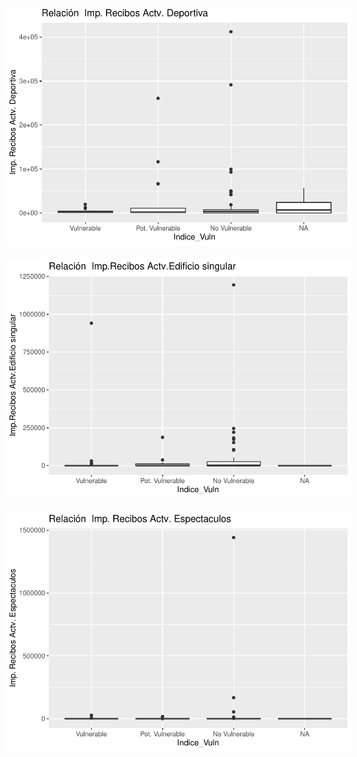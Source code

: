 \documentclass[notspecified,article,submit,moreauthors,pdftex]{Definitions/mdpi}
\begin{document}
\begin{center}\includegraphics{./figure/unnamed-chunk-23-23} \end{center}

\begin{center}\includegraphics{./figure/unnamed-chunk-23-24} \end{center}

\begin{center}\includegraphics{./figure/unnamed-chunk-23-25} \end{center}
\end{document}
